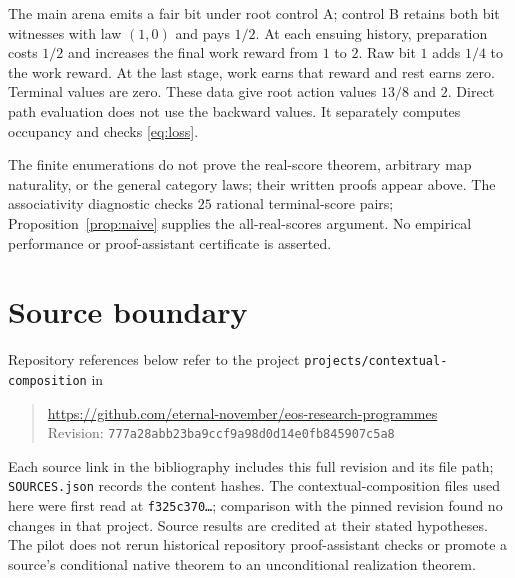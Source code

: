 \documentclass[11pt]{article}
\theoremstyle{definition}
\newcommand{\reporev}{777a28abb23ba9ccf9a98d0d14e0fb845907c5a8}
\begin{document}
The main arena emits a fair bit under root control A; control B retains
both bit witnesses with law \((1,0)\) and pays \(1/2\). At each ensuing
history, preparation costs \(1/2\) and increases the final work reward from
\(1\) to \(2\). Raw bit \(1\) adds \(1/4\) to the work reward. At the last
stage, work earns that reward and rest earns zero. Terminal values are
zero. These data give root action values \(13/8\) and \(2\).
Direct path evaluation does not use the backward values. It separately
computes occupancy and checks \eqref{eq:loss}.

The finite enumerations do not prove the real-score theorem, arbitrary
map naturality, or the general category laws; their written proofs appear
above. The associativity diagnostic checks \(25\) rational terminal-score
pairs; Proposition~\ref{prop:naive} supplies the all-real-scores argument.
No empirical performance or proof-assistant certificate is asserted.

\section{Source boundary}
Repository references below refer to the project
\texttt{projects/contextual-composition} in
\begin{quote}
\url{https://github.com/eternal-november/eos-research-programmes}\\
Revision: \texttt{\reporev}
\end{quote}
Each source link in the bibliography includes this full revision and its
file path; \texttt{SOURCES.json} records the content hashes.
The contextual-composition files used here
were first read at \texttt{f325c370\ldots}; comparison with the pinned
revision found no changes in that project. Source results are credited
at their stated hypotheses. The pilot does not rerun historical repository
proof-assistant checks or promote a source's conditional native theorem
to an unconditional realization theorem.
\end{document}
